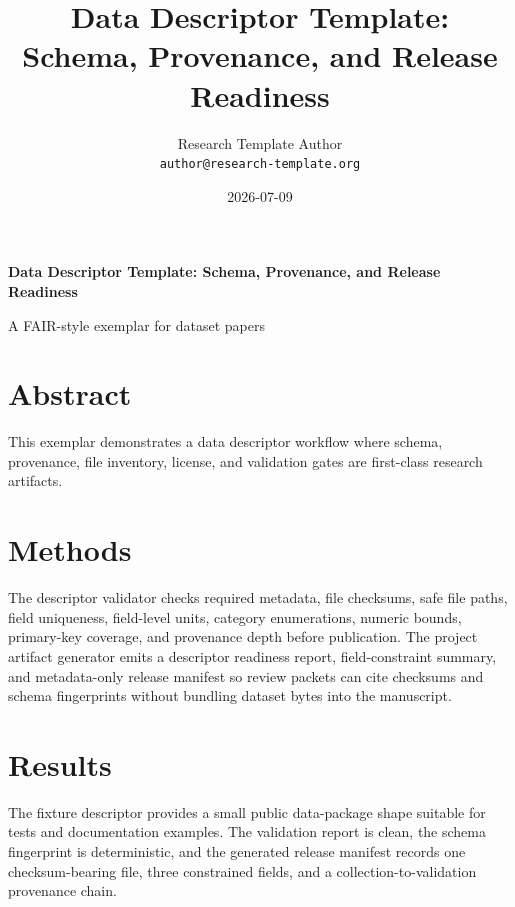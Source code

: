 \documentclass[
]{article}
\author{}
\date{}
\title{Data Descriptor Template: Schema, Provenance, and Release Readiness}
\author{Research Template Author\\\footnotesize{\texttt{author@research-template.org}}}
\date{2026-07-09}
\begin{document}
\begin{titlepage}
\centering
\vspace*{2cm}
{\LARGE\bfseries Data Descriptor Template: Schema, Provenance, and Release Readiness\par}
\vspace{0.75em}
{\large A FAIR-style exemplar for dataset papers\par}
\vfill
\makeatletter
{\@author\par}
\vspace{1em}
{\@date\par}
\makeatother
\vfill
\end{titlepage}
\thispagestyle{empty}
\tableofcontents
\newpage


\section{Abstract}\label{abstract}

This exemplar demonstrates a data descriptor workflow where schema,
provenance, file inventory, license, and validation gates are
first-class research artifacts.

\newpage

\section{Methods}\label{methods}

The descriptor validator checks required metadata, file checksums, safe
file paths, field uniqueness, field-level units, category enumerations,
numeric bounds, primary-key coverage, and provenance depth before
publication. The project artifact generator emits a descriptor readiness
report, field-constraint summary, and metadata-only release manifest so
review packets can cite checksums and schema fingerprints without
bundling dataset bytes into the manuscript.

\newpage

\section{Results}\label{results}

The fixture descriptor provides a small public data-package shape
suitable for tests and documentation examples. The validation report is
clean, the schema fingerprint is deterministic, and the generated
release manifest records one checksum-bearing file, three constrained
fields, and a collection-to-validation provenance chain.



\clearpage


\end{document}
